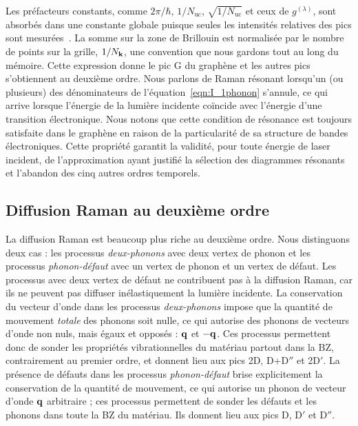 Les préfacteurs constants, comme $2\pi/\hbar$, $1/N_\text{uc}$, $\sqrt{1/N_\text{uc}}$ et ceux de $g^{(\lambda)}$, sont absorbés dans une constante globale puisque seules les intensités relatives des pics sont mesurées~\cite{venezuelaTheoryDoubleresonantRaman2011}. La somme sur la zone de Brillouin est normalisée par le nombre de points sur la grille, $1/N_{\mathbf{k}}$, une convention que nous gardons tout au long du mémoire. Cette expression donne le pic G du graphène et les autres pics s'obtiennent au deuxième ordre. Nous parlons de Raman résonant lorsqu'un (ou plusieurs) des dénominateurs de l'équation~\eqref{eqn:I_1phonon} s'annule, ce qui arrive lorsque l'énergie de la lumière incidente coïncide avec l'énergie d'une transition électronique. Nous notons que cette condition de résonance est toujours satisfaite dans le graphène en raison de la particularité de sa structure de bandes électroniques. Cette propriété garantit la validité, pour toute énergie de laser incident, de l'approximation ayant justifié la sélection des diagrammes résonants et l'abandon des cinq autres ordres temporels.

\subsection{Diffusion Raman au deuxième ordre}

La diffusion Raman est beaucoup plus riche au deuxième ordre.
Nous distinguons deux cas : les processus \textit{deux-phonons} avec deux vertex de phonon et les processus \textit{phonon-défaut} avec un vertex de phonon et un vertex de défaut. Les processus avec deux vertex de défaut ne contribuent pas à la diffusion Raman, car ils ne peuvent pas diffuser inélastiquement la lumière incidente. La conservation du vecteur d'onde dans les processus \textit{deux-phonons} impose que la quantité de mouvement \textit{totale} des phonons soit nulle, ce qui autorise des phonons de vecteurs d'onde non nuls, mais égaux et opposés : $\mathbf{q}$ et $-\mathbf{q}$. Ces processus permettent donc de sonder les propriétés vibrationnelles du matériau partout dans la BZ, contrairement au premier ordre, et donnent lieu aux pics 2D, D+D$''$ et 2D$'$. La présence de défauts dans les processus \textit{phonon-défaut} brise explicitement la conservation de la quantité de mouvement, ce qui autorise un phonon de vecteur d'onde $\mathbf{q}$ arbitraire ; ces processus permettent de sonder les défauts et les phonons dans toute la BZ du matériau. Ils donnent lieu aux pics D, D$'$ et D$''$.

